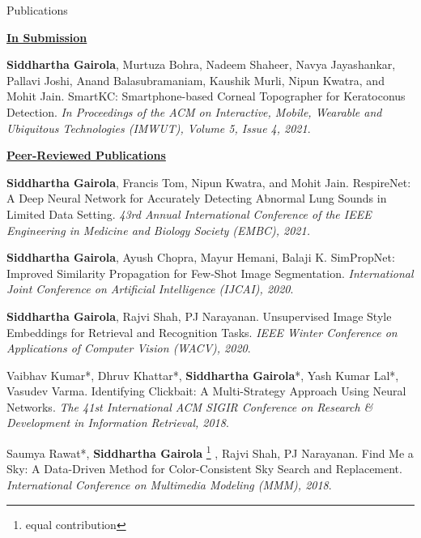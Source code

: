 \documentclass{resume} %
\renewcommand{\thefootnote}{\alph{footnote}}
\newcommand{\astfootnote}[1]{%
\let\oldthefootnote=\thefootnote%
\setcounter{footnote}{0}%
\renewcommand{\thefootnote}{\fnsymbol{footnote}}%
\footnote{#1}%
\let\thefootnote=\oldthefootnote%
}
\begin{document}
\begin{rSection}{Publications} \itemsep -2pt

\begin{rSubsection}{\large \underline {\textbf{In Submission}} }{}{}{}
\item \textbf{Siddhartha Gairola}, Murtuza Bohra, Nadeem Shaheer, Navya Jayashankar, Pallavi Joshi, Anand Balasubramaniam, Kaushik Murli, Nipun Kwatra, and Mohit Jain. SmartKC: Smartphone-based Corneal Topographer for Keratoconus Detection. \textit{In Proceedings of the ACM on Interactive, Mobile, Wearable and Ubiquitous Technologies (IMWUT), Volume 5, Issue 4, 2021}.
\end{rSubsection}

\begin{rSubsection}{\large \underline{\textbf{Peer-Reviewed Publications}} }{}{}{}
\item \textbf{Siddhartha Gairola}, Francis Tom, Nipun Kwatra, and Mohit Jain. RespireNet: A Deep Neural Network for Accurately Detecting Abnormal Lung Sounds in Limited Data Setting. \textit{43rd Annual International Conference of the IEEE Engineering in Medicine and Biology Society (EMBC), 2021.}

\vspace{4pt}
\item \textbf{Siddhartha Gairola}, Ayush Chopra, Mayur Hemani, Balaji K. SimPropNet:  Improved Similarity Propagation for Few-Shot Image Segmentation. \textit{International Joint Conference on Artificial Intelligence (IJCAI), 2020}.

\vspace{4pt}
\item \textbf{Siddhartha Gairola}, Rajvi Shah, PJ Narayanan. Unsupervised Image Style Embeddings for Retrieval and Recognition Tasks. \textit{IEEE Winter Conference on Applications of Computer Vision (WACV), 2020}.

\vspace{4pt}
\item Vaibhav Kumar*, Dhruv Khattar*, \textbf{Siddhartha Gairola}*, Yash Kumar Lal*, Vasudev Varma. Identifying Clickbait:  A Multi-Strategy Approach Using Neural Networks. \textit{The 41st International ACM SIGIR Conference on Research \& Development in Information Retrieval, 2018}.

\vspace{4pt}
\item Saumya Rawat*, \textbf{Siddhartha Gairola}\astfootnote{equal contribution}, Rajvi Shah, PJ Narayanan. Find Me a Sky: A Data-Driven Method for Color-Consistent Sky Search and Replacement. \textit{International Conference on Multimedia Modeling (MMM), 2018}.
\end{rSubsection}
\end{rSection}
\end{document}
